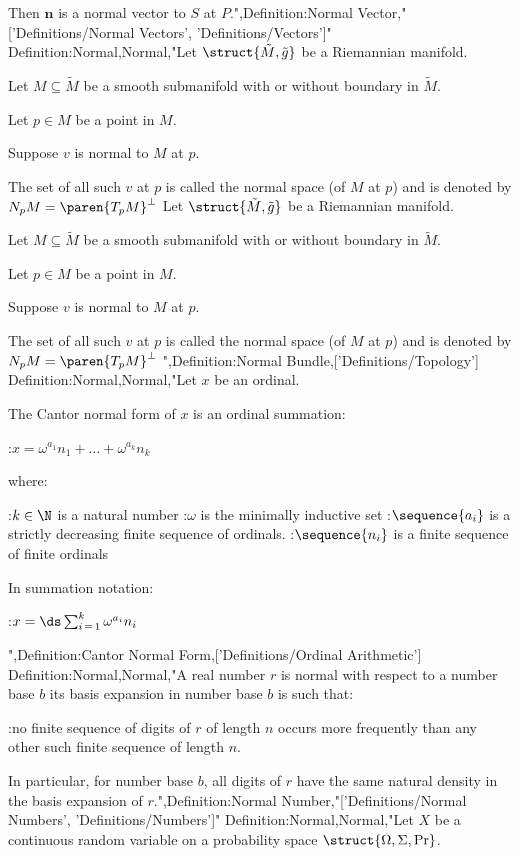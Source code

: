 Then $\mathbf n$ is a normal vector to $S$ at $P$.",Definition:Normal Vector,"['Definitions/Normal Vectors', 'Definitions/Vectors']"
Definition:Normal,Normal,"Let $\struct {\tilde M, \tilde g}$ be a Riemannian manifold.

Let $M \subseteq \tilde M$ be a smooth submanifold with or without boundary in $\tilde M$.

Let $p \in M$ be a point in $M$.

Suppose $v$ is normal to $M$ at $p$.


The set of all such $v$ at $p$ is called the normal space (of $M$ at $p$) and is denoted by $N_p M = \paren {T_p M}^\perp$
Let $\struct {\tilde M, \tilde g}$ be a Riemannian manifold.

Let $M \subseteq \tilde M$ be a smooth submanifold with or without boundary in $\tilde M$.

Let $p \in M$ be a point in $M$.

Suppose $v$ is normal to $M$ at $p$.


The set of all such $v$ at $p$ is called the normal space (of $M$ at $p$) and is denoted by $N_p M = \paren {T_p M}^\perp$
",Definition:Normal Bundle,['Definitions/Topology']
Definition:Normal,Normal,"Let $x$ be an ordinal.


The Cantor normal form of $x$ is an ordinal summation:

:$x = \omega^{a_1} n_1 + \dots + \omega^{a_k} n_k$

where:

:$k \in \N$ is a natural number
:$\omega$ is the minimally inductive set
:$\sequence {a_i}$ is a strictly decreasing finite sequence of ordinals.
:$\sequence {n_i}$ is a finite sequence of finite ordinals


In summation notation:

:$x = \ds \sum_{i \mathop = 1}^k \omega^{a_i} n_i$

",Definition:Cantor Normal Form,['Definitions/Ordinal Arithmetic']
Definition:Normal,Normal,"A real number $r$ is normal with respect to a number base $b$  its basis expansion in number base $b$ is such that:

:no finite sequence of digits of $r$ of length $n$ occurs more frequently than any other such finite sequence of length $n$.


In particular, for number base $b$, all digits of $r$ have the same natural density in the basis expansion of $r$.",Definition:Normal Number,"['Definitions/Normal Numbers', 'Definitions/Numbers']"
Definition:Normal,Normal,"Let $X$ be a continuous random variable on a probability space $\struct {\Omega, \Sigma, \Pr}$.



